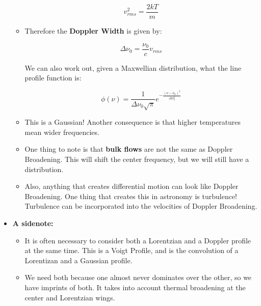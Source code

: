 \documentclass{article}
\begin{document}
\begin{itemize}
\begin{itemize}
        \begin{equation}
            v_{rms}^2 = \frac{2kT}{m}
        \end{equation}
        
        \item Therefore the \textbf{Doppler Width} is given by:
        
        \begin{equation}
            \boxed{\Delta \nu_0 = \frac{\nu_0}{c} v_{rms}}
        \end{equation}
        
        We can also work out, given a Maxwellian distribution, what the line profile function is:
        
        \begin{equation}
            \boxed{\phi(\nu) = \frac{1}{\Delta \nu_0 \sqrt{\pi}} e^{-\frac{\left(\nu-\nu_0\right)^2}{\Delta \nu_0^2}}}
        \end{equation}
        
        \item This is a Gaussian! Another consequence is that higher temperatures mean wider frequencies.
        
        \item One thing to note is that \textbf{bulk flows} are not the same as Doppler Broadening. This will shift the center frequency, but we will still have a distribution.
        
        \item Also, anything that creates differential motion can look like Doppler Broadening. One thing that creates this in astronomy is turbulence! Turbulence can be incorporated into the velocities of Doppler Broadening. 
    \end{itemize}
    
    \item \textbf{A sidenote:}
    \begin{itemize}
        \item It is often necessary to consider both a Lorentzian and a Doppler profile at the same time. This is a Voigt Profile, and is the convolution of a Lorentizan and a Gaussian profile.
        
        \item We need both because one almost never dominates over the other, so we have imprints of both. It takes into account thermal broadening at the center and Lorentzian wings.
    \end{itemize}
    

\end{itemize}
\end{document}
